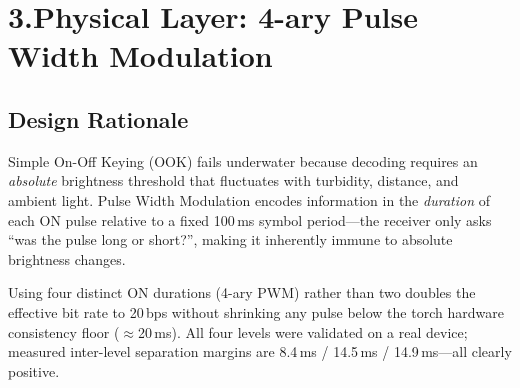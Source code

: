 \documentclass[10pt,a4paper]{article}
\begin{document}
\section{3.\enspace Physical Layer: 4-ary Pulse Width Modulation}

\subsection{Design Rationale}
Simple On-Off Keying (OOK) fails underwater because decoding requires an \emph{absolute}
brightness threshold that fluctuates with turbidity, distance, and ambient light.
Pulse Width Modulation encodes information in the \emph{duration} of each ON pulse relative
to a fixed 100\,ms symbol period---the receiver only asks ``was the pulse long or short?'',
making it inherently immune to absolute brightness changes.

Using four distinct ON durations (4-ary PWM) rather than two doubles the effective bit rate
to 20\,bps without shrinking any pulse below the torch hardware consistency floor
($\approx$20\,ms). All four levels were validated on a real device; measured inter-level
separation margins are 8.4\,ms / 14.5\,ms / 14.9\,ms---all clearly positive.
\end{document}
